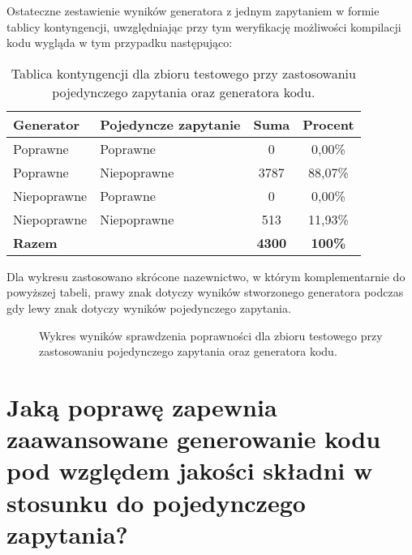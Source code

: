 Ostateczne zestawienie wyników generatora z jednym zapytaniem w formie tablicy kontyngencji, uwzględniając przy tym weryfikację możliwości kompilacji kodu wygląda w tym przypadku następująco:

\begin{table}[ht]
\caption{Tablica kontyngencji dla zbioru testowego przy zastosowaniu pojedynczego zapytania oraz generatora kodu.}\label{tab:tabela11}
\centering%
\begin{tabular}{|l|l|c|c|}
\hline
\textbf{Generator} & \textbf{Pojedyncze zapytanie} & \textbf{Suma} & \textbf{Procent} \\
\hline
Poprawne & Poprawne & 0 & 0,00\% \\
\hline
Poprawne & Niepoprawne & 3787 & 88,07\% \\
\hline
Niepoprawne & Poprawne & 0 & 0,00\% \\
\hline
Niepoprawne & Niepoprawne & 513 & 11,93\% \\
\hline
\textbf{Razem} & & \textbf{4300} & \textbf{100\%} \\
\hline
\end{tabular}
\end{table}

Dla wykresu zastosowano skrócone nazewnictwo, w którym komplementarnie do powyższej tabeli, prawy znak dotyczy wyników stworzonego generatora podczas gdy lewy znak dotyczy wyników pojedynczego zapytania.

\begin{figure}[H]
\centering
{}
\caption{Wykres wyników sprawdzenia poprawności dla zbioru testowego przy zastosowaniu pojedynczego zapytania oraz generatora kodu.}\label{rys:plama2k}
\end{figure}

\section{Jaką poprawę zapewnia zaawansowane generowanie kodu pod względem jakości składni w stosunku do pojedynczego zapytania?}


